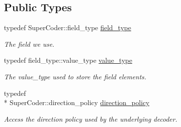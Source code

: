\subsection*{Public Types}
\begin{DoxyCompactItemize}
\item 
\hypertarget{classkodo_1_1linear__block__decoder__delayed_a389fff9ec0b312fcf6645169684bb316}{typedef Super\-Coder\-::field\-\_\-type \hyperlink{classkodo_1_1linear__block__decoder__delayed_a389fff9ec0b312fcf6645169684bb316}{field\-\_\-type}}\label{classkodo_1_1linear__block__decoder__delayed_a389fff9ec0b312fcf6645169684bb316}

\begin{DoxyCompactList}\small\item\em The field we use. \end{DoxyCompactList}\item 
\hypertarget{classkodo_1_1linear__block__decoder__delayed_af82c96ec9377c711acfb52c01183dd4c}{typedef field\-\_\-type\-::value\-\_\-type \hyperlink{classkodo_1_1linear__block__decoder__delayed_af82c96ec9377c711acfb52c01183dd4c}{value\-\_\-type}}\label{classkodo_1_1linear__block__decoder__delayed_af82c96ec9377c711acfb52c01183dd4c}

\begin{DoxyCompactList}\small\item\em The value\-\_\-type used to store the field elements. \end{DoxyCompactList}\item 
\hypertarget{classkodo_1_1linear__block__decoder__delayed_a6d811d8ce9d33c3d0a510acb5ac73cc3}{typedef \\*
Super\-Coder\-::direction\-\_\-policy \hyperlink{classkodo_1_1linear__block__decoder__delayed_a6d811d8ce9d33c3d0a510acb5ac73cc3}{direction\-\_\-policy}}\label{classkodo_1_1linear__block__decoder__delayed_a6d811d8ce9d33c3d0a510acb5ac73cc3}

\begin{DoxyCompactList}\small\item\em Access the direction policy used by the underlying decoder. \end{DoxyCompactList}\end{DoxyCompactItemize}

